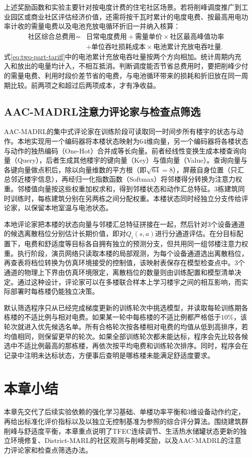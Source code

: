 上述奖励函数和实验主要针对按电度计费的住宅社区场景。若将削峰调度推广到工业园区或商业社区评估经济价值，还需将按千瓦时累计的电度电费、按最高用电功率计收的需量电费以及电池充放电循环折旧一并纳入核算：
\begin{equation}
    \label{eq:two-part-tariff}
    \begin{aligned}
        \text{社区综合总费用}={} & \text{日常电度费用}+\text{需量单价}\times\text{社区最高峰值功率} \\
                          & +\text{单位吞吐损耗成本}\times\text{电池累计充放电吞吐量}.
    \end{aligned}
\end{equation}
式\eqref{eq:two-part-tariff}中的电池累计充放电吞吐量按两个方向相加。统计周期内充入和放出的电量均计入，不相互抵消。判断调度能否节省总费用时，要把削峰少付的需量电费、利用时段价差节省的电费，与电池循环带来的损耗和折旧放在同一周期比较。前两项之和超过后两项成本，才有净收益。

\subsection{AAC-MADRL注意力评论家与检查点筛选}
AAC-MADRL的集中式评论家在训练阶段可读取同一时间步所有楼宇的状态与动作。本地实现用一个编码器将本楼状态映射为64维向量，另一个编码器将各楼状态与动作的独热编码（One-Hot）合并成等长向量。前者经线性变换生成本楼查询向量（Query），后者生成其他楼宇的键向量（Key）与值向量（Value）。查询向量与各键向量做点积后，除以向量维数的平方根（即$\sqrt{64}=8$），屏蔽自身位置（只汇总邻近楼宇信息），再经归一化指数函数（Softmax）将邻楼得分转换为注意力权重。邻楼值向量按这些权重加权求和，得到邻楼状态和动作汇总特征。3栋建筑同时训练时，每栋建筑分别在另两栋之间分配权重。本楼状态同时经独立分支传给评论家，以保留本地室温与电池状态。

本地评论家把本楼的状态向量与邻楼汇总特征拼接在一起，然后针对3个设备通道的候选离散档位分别估计长期价值，即对$Q_i(s,a)$进行分通道评估。在分目标配置下，电费和舒适度等目标各自拥有独立的预测分支，但共用同一组邻楼注意力权重。执行阶段，演员网络只读取本楼的局部观测，为每个设备通道选出离散档位，再查表将档位转换为仿真环境接受的控制值，该映射表保存在模型检查点中。3个通道的物理上下界由仿真环境限定，离散档位的数量则由训练配置和模型清单决定。通过这种设计，评论家可以在多楼联合样本上学习楼宇之间的相互影响，而实际部署时每栋楼仍能独立决策。

默认筛选程序只从已经完成梯度更新的训练轮次中挑选模型，并读取每轮训练期各栋楼的不适比例与相对电费。如果某一轮中每栋楼的不适比例都严格低于$10\%$，该轮次就进入优先候选名单。所有合格轮次按各楼相对电费的均值从低到高排序，若均值相同，则保留更早的轮次。如果全部训练轮次都未能达标，程序会先比较各候选中不适比例最高的那栋楼，再依次按平均电费和训练轮次排序。同时，程序会在记录中注明未达标状态，方便事后查明是哪栋楼未能满足舒适度要求。

\section{本章小结}
本章先交代了后续实验依赖的强化学习基础、单楼功率平衡和3维设备动作约定，再给出标准化评价指标以及以独立无控制基准为参照的综合评分算法。围绕建筑群削峰与舒适度平衡，本章重点说明了TFEC连续调节、生活热水储罐状态更新的独立环境修复、District-MARL的社区观测与削峰奖励，以及AAC-MADRL的注意力评论家和检查点筛选办法。
